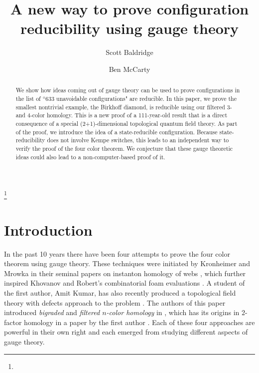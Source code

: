 \documentclass[12pt]{amsart}
\theoremstyle{definition}
\theoremstyle{remark}
\numberwithin{equation}{section}
\begin{document}
\title{A new way to prove  configuration reducibility using gauge theory}


\thanks{}


\author{Scott Baldridge}
\address{Department of Mathematics, Louisiana State University\\
Baton Rouge, LA}

\author{Ben McCarty}
\address{Department of Mathematical Sciences, University of Memphis\\
Memphis, TN}

\subjclass{}
\date{}




\begin{abstract} We show how ideas coming out of gauge theory can be used to prove  configurations in the list of ``633 unavoidable configurations" are reducible. In this paper, we prove the smallest nontrivial example, the Birkhoff diamond, is reducible using our filtered $3$- and $4$-color homology. This is a new proof of a 111-year-old result that is a direct consequence of a special (2+1)-dimensional topological quantum field theory.  As part of the proof, we introduce the idea of  a state-reducible configuration. Because state-reducibility does not involve Kempe switches, this leads to an independent way to verify the proof of the four color theorem. We conjecture that  these gauge theoretic ideas  could also lead to a non-computer-based proof of it.
\end{abstract}


\maketitle


\section{Introduction}

In the past 10 years there have been four attempts to prove the four color theorem using gauge theory. These techniques were initiated by Kronheimer and Mrowka in their seminal papers on instanton homology of webs \cite{KM1, KM2, KM3}, which further inspired Khovanov and Robert's combinatorial foam evaluations \cite{KR}.  A student of the first author, Amit Kumar, has also recently produced a topological field theory with defects approach to the problem \cite{Kumar}.  The authors of this paper introduced {\em bigraded} and {\em filtered $n$-color homology} in \cite{BMcC}, which has its origins in $2$-factor homology in a paper by the first author \cite{BaldCohomology}.  Each of these four approaches are powerful in their own right and each emerged from studying different aspects of gauge theory.  
\end{document}
